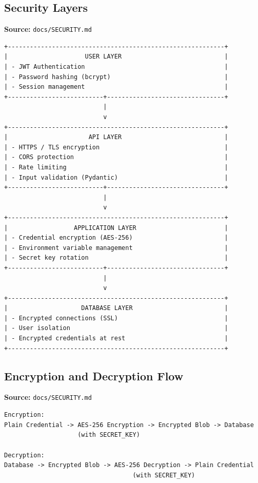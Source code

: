\newpage


\subsection{Security Layers}
\textbf{Source:} \texttt{docs/SECURITY.md}
\begin{lstlisting}[numbers=none,basicstyle=\ttfamily\tiny,caption={Security Layers Adapted from docs/SECURITY.md}]
+-----------------------------------------------------------+
|                     USER LAYER                            |
| - JWT Authentication                                      |
| - Password hashing (bcrypt)                               |
| - Session management                                      |
+--------------------------+--------------------------------+
                           |
                           v
+-----------------------------------------------------------+
|                      API LAYER                            |
| - HTTPS / TLS encryption                                  |
| - CORS protection                                         |
| - Rate limiting                                           |
| - Input validation (Pydantic)                             |
+--------------------------+--------------------------------+
                           |
                           v
+-----------------------------------------------------------+
|                  APPLICATION LAYER                        |
| - Credential encryption (AES-256)                         |
| - Environment variable management                         |
| - Secret key rotation                                     |
+--------------------------+--------------------------------+
                           |
                           v
+-----------------------------------------------------------+
|                    DATABASE LAYER                         |
| - Encrypted connections (SSL)                             |
| - User isolation                                          |
| - Encrypted credentials at rest                           |
+-----------------------------------------------------------+
\end{lstlisting}

\subsection{Encryption and Decryption Flow}
\textbf{Source:} \texttt{docs/SECURITY.md}
\begin{lstlisting}[numbers=none,basicstyle=\ttfamily\tiny,caption={Encryption and Decryption Flow Adapted from docs/SECURITY.md}]
Encryption:
Plain Credential -> AES-256 Encryption -> Encrypted Blob -> Database
                    (with SECRET_KEY)

Decryption:
Database -> Encrypted Blob -> AES-256 Decryption -> Plain Credential
                                   (with SECRET_KEY)
\end{lstlisting}


